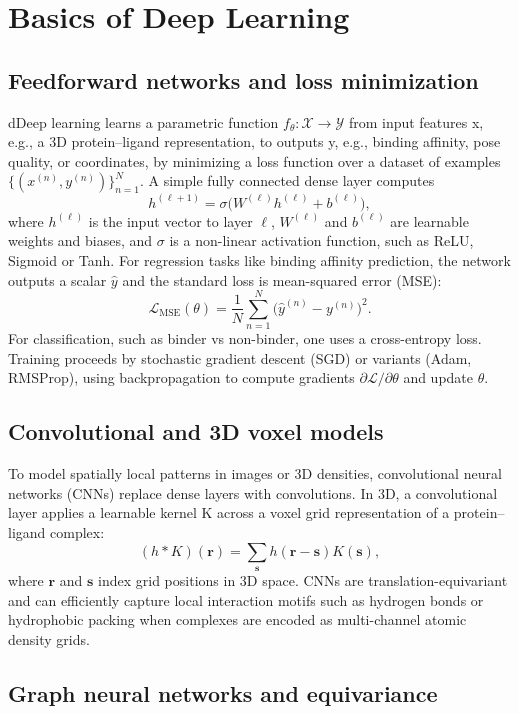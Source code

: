 \documentclass[12pt]{article}
\begin{document}
\section{Basics of Deep Learning}

\subsection{Feedforward networks and loss minimization}

dDeep learning learns a parametric function $f_{\theta}: \mathcal{X} \to \mathcal{Y}$ from input features x, e.g., a 3D protein–ligand representation, to outputs y, e.g., binding affinity, pose quality, or coordinates, by minimizing a loss function over a dataset of examples $\{(x^{(n)}, y^{(n)})\}_{n=1}^{N}$. A simple fully connected dense layer computes
\[
h^{(\ell+1)} = \sigma\!\big( W^{(\ell)} h^{(\ell)} + b^{(\ell)} \big),
\]
where $h^{(\ell)}$ is the input vector to layer $\ell$, $W^{(\ell)}$ and $b^{(\ell)}$ are learnable weights and biases, and $\sigma$ is a non-linear activation function, such as ReLU, Sigmoid or Tanh. For regression tasks like binding affinity prediction, the network outputs a scalar $\hat{y}$ and the standard loss is mean-squared error (MSE):
\[
\mathcal{L}_{\text{MSE}}(\theta) = \frac{1}{N} \sum_{n=1}^{N} \big( \hat{y}^{(n)} - y^{(n)} \big)^2.
\]
For classification, such as binder vs non-binder, one uses a cross-entropy loss. Training proceeds by stochastic gradient descent (SGD) or variants (Adam, RMSProp), using backpropagation to compute gradients $\partial \mathcal{L} / \partial \theta$ and update $\theta$.

\subsection{Convolutional and 3D voxel models}

To model spatially local patterns in images or 3D densities, convolutional neural networks (CNNs) replace dense layers with convolutions. In 3D, a convolutional layer applies a learnable kernel K across a voxel grid representation of a protein–ligand complex:
\[
(h * K)(\mathbf{r}) = \sum_{\mathbf{s}} h(\mathbf{r} - \mathbf{s}) K(\mathbf{s}),
\]
where $\mathbf{r}$ and $\mathbf{s}$ index grid positions in 3D space. CNNs are translation-equivariant and can efficiently capture local interaction motifs such as hydrogen bonds or hydrophobic packing when complexes are encoded as multi-channel atomic density grids.

\subsection{Graph neural networks and equivariance}
\end{document}
